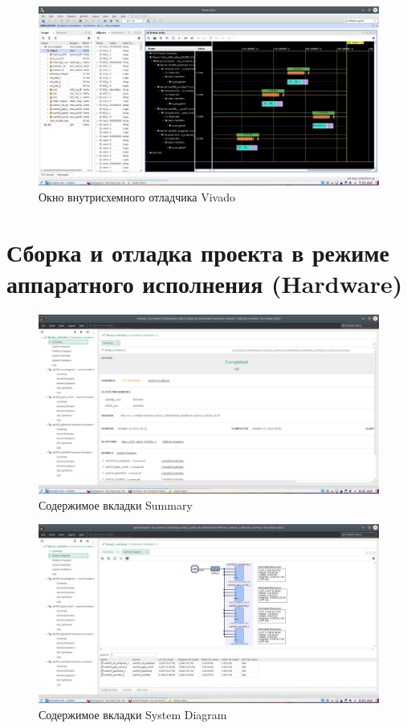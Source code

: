 \begin{figure}[ht]
	\centering
	\includegraphics[width=0.9\linewidth]{img/hw-2}
	\caption{Окно внутрисхемного отладчика Vivado}
	\label{fig:hw-2}
\end{figure}

\chapter{Сборка и отладка проекта в режиме аппаратного
исполнения (Hardware)}

\begin{figure}[ht]
	\centering
	\includegraphics[width=0.9\linewidth]{img/hw-3}
	\caption{Содержимое вкладки Summary}
	\label{fig:hw-3}
\end{figure}

\begin{figure}[ht]
	\centering
	\includegraphics[width=0.9\linewidth]{img/hw-4}
	\caption{Содержимое вкладки System Diagram}
	\label{fig:hw-4}
\end{figure}

